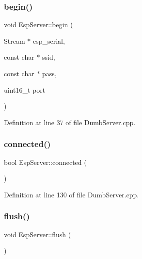 \mbox{\label{class_esp_server_a1d032e732d4733905d676ef016fcd43c}} 
\subsubsection{\texorpdfstring{begin()}{begin()}}
{\footnotesize\ttfamily void Esp\+Server\+::begin (\begin{DoxyParamCaption}\item[{Stream $\ast$}]{esp\+\_\+serial,  }\item[{const char $\ast$}]{ssid,  }\item[{const char $\ast$}]{pass,  }\item[{uint16\+\_\+t}]{port }\end{DoxyParamCaption})}



Definition at line 37 of file Dumb\+Server.\+cpp.

\mbox{\label{class_esp_server_a6a25e008ded89de0e4599df7170008fb}} 
\subsubsection{\texorpdfstring{connected()}{connected()}}
{\footnotesize\ttfamily bool Esp\+Server\+::connected (\begin{DoxyParamCaption}{ }\end{DoxyParamCaption})}



Definition at line 130 of file Dumb\+Server.\+cpp.

\mbox{\label{class_esp_server_a05062a3ac7c70a79e991b66789384bf1}} 
\subsubsection{\texorpdfstring{flush()}{flush()}}
{\footnotesize\ttfamily void Esp\+Server\+::flush (\begin{DoxyParamCaption}{ }\end{DoxyParamCaption})\hspace{0.3cm}{\ttfamily [virtual]}}



